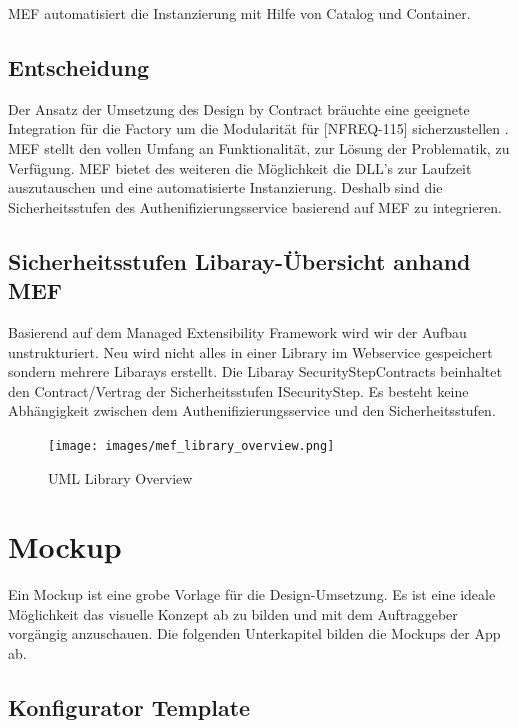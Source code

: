 MEF automatisiert die Instanzierung mit Hilfe von Catalog und Container.

\subsection{Entscheidung}\label{entscheidung-1}

Der Ansatz der Umsetzung des Design by Contract bräuchte eine geeignete
Integration für die Factory um die Modularität für {[}NFREQ-115{]}
sicherzustellen . MEF stellt den vollen Umfang an Funktionalität, zur
Lösung der Problematik, zu Verfügung. MEF bietet des weiteren die
Möglichkeit die DLL's zur Laufzeit auszutauschen und eine automatisierte
Instanzierung. Deshalb sind die Sicherheitsstufen des
Authenifizierungsservice basierend auf MEF zu integrieren.

\newpage

\subsection{Sicherheitsstufen Libaray-Übersicht anhand
MEF}\label{sicherheitsstufen-libaray-uxfcbersicht-anhand-mef}

Basierend auf dem Managed Extensibility Framework wird wir der Aufbau
unstrukturiert. Neu wird nicht alles in einer Library im Webservice
gespeichert sondern mehrere Libarays erstellt. Die Libaray
SecurityStepContracts beinhaltet den Contract/Vertrag der
Sicherheitsstufen ISecurityStep. Es besteht keine Abhängigkeit zwischen
dem Authenifizierungsservice und den Sicherheitsstufen.

\begin{figure}[htbp]
\centering
\texttt{[image: images/mef\_library\_overview.png]}
\caption{UML Library Overview}
\end{figure}

\newpage

\section{Mockup}\label{mockup}

Ein Mockup ist eine grobe Vorlage für die Design-Umsetzung. Es ist eine
ideale Möglichkeit das visuelle Konzept ab zu bilden und mit dem
Auftraggeber vorgängig anzuschauen. Die folgenden Unterkapitel bilden
die Mockups der App ab.

\hypertarget{konfigurator-template}{\subsection{Konfigurator
Template}\label{konfigurator-template}}

